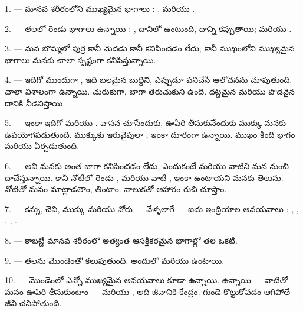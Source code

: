 \VUsaut{2.4mm}
\VUsaut{3.0mm}

\VUsaut{3.0mm}

1. --- మానవ శరీరంలోని ముఖ్యమైన భాగాలు : ,  మరియు .

2. --- తలలో రెండు భాగాలు ఉన్నాయి : , దానిలో  ఉంటుంది, దాన్ని
 కప్పుతాయి; మరియు .

3. --- మన బొమ్మలో పుర్రె కానీ మెదడు కానీ కనిపించడం లేదు; కానీ ముఖంలోని ముఖ్యమైన భాగాలు మనకు
చాలా స్పష్టంగా కనిపిస్తున్నాయి.

4. --- ఇదిగో ముందుగా , ఇది బలమైన బుద్ధిని, ఎప్పుడూ పనిచేసే ఆలోచనను చూపుతుంది.
 చాలా విశాలంగా ఉన్నాయి.  చురుకుగా, బాగా తెరుచుకుని ఉంది. దట్టమైన
 మరియు పొడవైన  దానికి నీడనిస్తాయి.

5. --- ఇంకా ఇదిగో  మరియు . వాసన చూసేందుకు, ఊపిరి
తీసుకునేందుకు ముక్కు మనకు ఉపయోగపడుతుంది. ముక్కుకు ఇరువైపులా , ఇంకా దూరంగా
 ఉన్నాయి. ముఖం కింది భాగం  మరియు  ఏర్పడుతుంది.

6. --- అవి మనకు అంత బాగా కనిపించడం లేదు, ఎందుకంటే  మరియు 
వాటిని మన నుంచి దాచేస్తున్నాయి. కానీ నోటిలో రెండు ,  మరియు
 వాటి , ఇంకా  ఉంటాయని మనకు తెలుసు. నోటితో మనం
మాట్లాడతాం, తింటాం. నాలుకతో ఆహారం రుచి చూస్తాం.

7. --- కన్ను, చెవి, ముక్కు మరియు నోరు — వేళ్ళలాగే — ఐదు ఇంద్రియాల అవయవాలు : ,
, , , .

8. --- కాబట్టి మానవ శరీరంలో అత్యంత ఆసక్తికరమైన భాగాల్లో తల ఒకటి.

\VUsaut{4.4mm}
\VUsaut{3.0mm}

9. ---  తలను మొండెంతో కలుపుతుంది. అందులో  మరియు
 ఉంటాయి.

10. --- మొండెంలో ఎన్నో ముఖ్యమైన అవయవాలు కూడా ఉన్నాయి.  
ఉన్నాయి — వాటితో మనం ఊపిరి తీసుకుంటాం — మరియు , అది జీవానికి కేంద్రం. గుండె
కొట్టుకోవడం ఆగిపోతే జీవి చనిపోతుంది.

